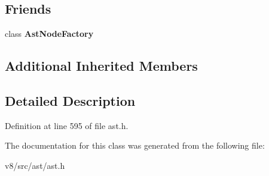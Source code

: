 \subsection*{Friends}
\begin{DoxyCompactItemize}
\item 
\mbox{\label{classv8_1_1internal_1_1ForStatement_a8d587c8ad3515ff6433eb83c578e795f}} 
class {\bfseries Ast\+Node\+Factory}
\end{DoxyCompactItemize}
\subsection*{Additional Inherited Members}


\subsection{Detailed Description}


Definition at line 595 of file ast.\+h.



The documentation for this class was generated from the following file\+:\begin{DoxyCompactItemize}
\item 
v8/src/ast/ast.\+h\end{DoxyCompactItemize}
